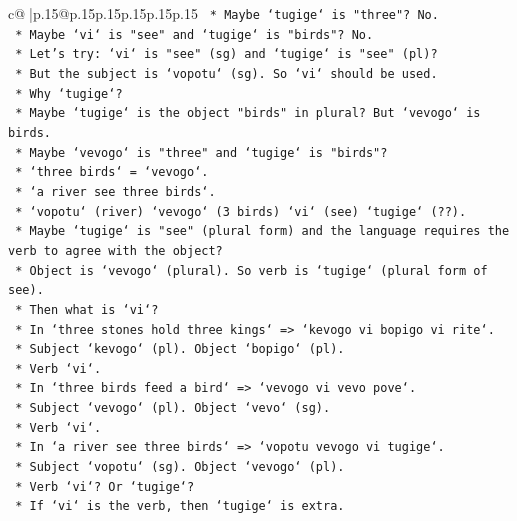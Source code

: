 \documentclass{article}
\begin{document}
{\begin{supertabular}{c@{$\;$}|p{.15\linewidth}@{}p{.15\linewidth}p{.15\linewidth}p{.15\linewidth}p{.15\linewidth}p{.15\linewidth}}
{{{\texttt{                *   Maybe `tugige` is "three"? No.} \\
\texttt{                *   Maybe `vi` is "see" and `tugige` is "birds"? No.} \\
\texttt{                *   Let's try: `vi` is "see" (sg) and `tugige` is "see" (pl)?} \\
\texttt{                *   But the subject is `vopotu` (sg). So `vi` should be used.} \\
\texttt{                *   Why `tugige`?} \\
\texttt{                *   Maybe `tugige` is the object "birds" in plural? But `vevogo` is birds.} \\
\texttt{                *   Maybe `vevogo` is "three" and `tugige` is "birds"?} \\
\texttt{                *   `three birds` = `vevogo`.} \\
\texttt{                *   `a river see three birds`.} \\
\texttt{                *   `vopotu` (river) `vevogo` (3 birds) `vi` (see) `tugige` (??).} \\
\texttt{                *   Maybe `tugige` is "see" (plural form) and the language requires the verb to agree with the object?} \\
\texttt{                *   Object is `vevogo` (plural). So verb is `tugige` (plural form of see).} \\
\texttt{                *   Then what is `vi`?} \\
\texttt{                *   In `three stones hold three kings` => `kevogo vi bopigo vi rite`.} \\
\texttt{                *   Subject `kevogo` (pl). Object `bopigo` (pl).} \\
\texttt{                *   Verb `vi`.} \\
\texttt{                *   In `three birds feed a bird` => `vevogo vi vevo pove`.} \\
\texttt{                *   Subject `vevogo` (pl). Object `vevo` (sg).} \\
\texttt{                *   Verb `vi`.} \\
\texttt{                *   In `a river see three birds` => `vopotu vevogo vi tugige`.} \\
\texttt{                *   Subject `vopotu` (sg). Object `vevogo` (pl).} \\
\texttt{                *   Verb `vi`? Or `tugige`?} \\
\texttt{                *   If `vi` is the verb, then `tugige` is extra.} \\
}}}
\end{supertabular}}
\end{document}
